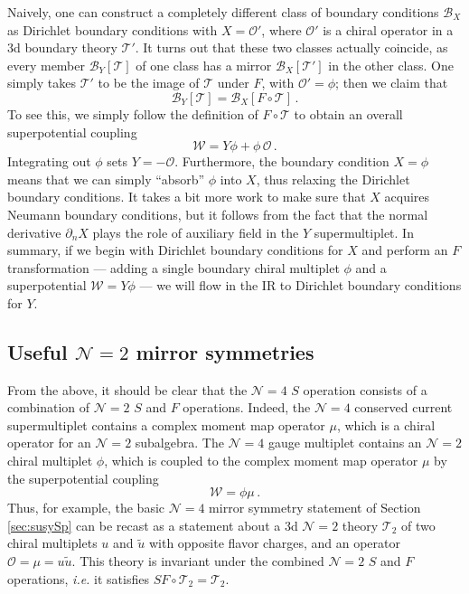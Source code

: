 \documentclass[hyper,letterpaper]{JHEP3}
\numberwithin{equation}{section}
\newcommand{\be}{\begin{equation}}
\newcommand{\ee}{\end{equation}}
\newcommand{\CB}{\mathcal{B}}
\newcommand{\CN}{\mathcal{N}}
\newcommand{\CO}{\mathcal{O}}
\newcommand{\CT}{\mathcal{T}}
\newcommand{\CW}{\mathcal{W}}
\begin{document}
Naively, one can construct a completely different class of boundary conditions $\CB_X$ as Dirichlet boundary conditions
with $X=\CO'$, where $\CO'$ is a chiral operator in a 3d boundary theory $\CT'$.
It turns out that these two classes actually coincide, as every member $\CB_Y[\CT]$ of one class has a mirror $\CB_X[\CT']$ in the other class.
One simply takes $\CT'$ to be the image of $\CT$ under $F$, with $\CO' = \phi$; then we claim that
%
\be \CB_Y[\CT] = \CB_X[F\circ\CT]\,. \ee
%
To see this, we simply follow the definition of $F\circ\CT$ to obtain an overall superpotential coupling
\begin{equation}
\CW = Y \phi + \phi\,\CO \,.
\end{equation}
Integrating out $\phi$ sets $Y = - \CO$. Furthermore, the boundary condition $X=\phi$ means that we can simply ``absorb'' $\phi$ into $X$,
thus relaxing the Dirichlet boundary conditions. It takes a bit more work to make sure that $X$ acquires Neumann boundary conditions, but it
follows from the fact that the normal derivative $\partial_n X$ plays the role of auxiliary field in the $Y$ supermultiplet.
In summary, if we begin with Dirichlet boundary conditions for $X$ and perform an $F$ transformation --- adding a single boundary chiral multiplet $\phi$ and a superpotential $\CW = Y\phi$ --- we will flow in the IR to Dirichlet boundary conditions for $Y$.





\subsection{Useful $\CN=2$ mirror symmetries}
\label{sec:MS}


From the above, it should be clear that the $\CN=4$ $S$ operation consists of a combination of $\CN=2$ $S$ and $F$ operations.
Indeed, the $\CN=4$ conserved current supermultiplet contains a complex moment map operator $\mu$, which is a chiral operator for
an $\CN=2$ subalgebra. The $\CN=4$ gauge multiplet contains an $\CN=2$ chiral multiplet $\phi$, which is coupled
to the complex moment map operator $\mu$ by the superpotential coupling
\begin{equation}
\CW = \phi \mu \,.
\end{equation}
Thus, for example, the basic $\CN=4$ mirror symmetry statement of Section \ref{sec:susySp} can be recast as a statement about
a 3d $\CN=2$ theory $\CT_2$ of two chiral multiplets $u$ and $\tilde u$ with opposite flavor charges,
and an operator $\CO = \mu = u \tilde u$.
This theory is invariant under the combined $\CN=2$ $S$ and $F$ operations, {\it i.e.} it satisfies $S F \circ \CT_2 = \CT_2$.
\end{document}
